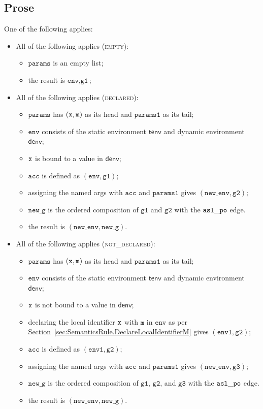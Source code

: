 \documentclass{book}
\newcommand\secref[1]{Section~\ref{sec:#1}}
\newcommand\tenv[0]{\textsf{tenv}}
\newcommand\denv[0]{\textsf{denv}}
\newcommand\newenv[0]{\texttt{new\_env}}
\newcommand\env[0]{\texttt{env}}
\newcommand\envone[0]{\texttt{env1}}
\newcommand\newg[0]{\texttt{new\_g}}
\newcommand\vm[0]{\texttt{m}}
\newcommand\vgone[0]{\texttt{g1}}
\newcommand\vgtwo[0]{\texttt{g2}}
\newcommand\vgthree[0]{\texttt{g3}}
\newcommand\params[0]{\texttt{params}}
\newcommand\paramsone[0]{\texttt{params1}}
\newcommand\vacc[0]{\texttt{acc}}
\begin{document}
\subsection{Prose}
One of the following applies:
\begin{itemize}
  \item All of the following applies (\textsc{empty}):
  \begin{itemize}
    \item $\params$ is an empty list;
    \item the result is $\env, \vgone$;
  \end{itemize}

  \item All of the following applies (\textsc{declared}):
  \begin{itemize}
    \item $\params$ has $(\vx,\vm)$ as its head and $\paramsone$ as its tail;
    \item $\env$ consists of the static environment $\tenv$ and dynamic environment $\denv$;
    \item $\texttt{x}$ is bound to a value in $\denv$;
    \item $\vacc$ is defined as $(\env,\vgone)$;
    \item assigning the named args with $\vacc$ and $\paramsone$ gives $(\newenv, \vgtwo)$;
    \item $\newg$ is the ordered composition of $\vgone$ and $\vgtwo$ with the $\mathtt{asl\_po}$ edge.
    \item the result is $(\newenv, \newg)$.
  \end{itemize}

  \item All of the following applies (\textsc{not\_declared}):
  \begin{itemize}
    \item $\params$ has $(\vx,\vm)$ as its head and $\paramsone$ as its tail;
    \item $\env$ consists of the static environment $\tenv$ and dynamic environment $\denv$;
    \item $\texttt{x}$ is not bound to a value in $\denv$;
    \item declaring the local identifier $\texttt{x}$ with $\vm$ in $\env$ as per \secref{SemanticsRule.DeclareLocalIdentifierM}
    gives $(\envone, \vgtwo)$;
    \item $\vacc$ is defined as $(\envone,\vgtwo)$;
    \item assigning the named args with $\vacc$ and $\paramsone$ gives $(\newenv, \vgthree)$;
    \item $\newg$ is the ordered composition of $\vgone$, $\vgtwo$, and $\vgthree$ with the $\mathtt{asl\_po}$ edge.
    \item the result is $(\newenv, \newg)$.
  \end{itemize}
\end{itemize}
\end{document}
